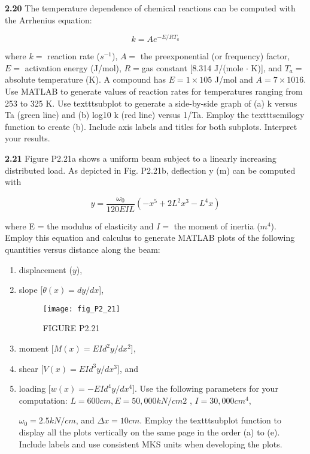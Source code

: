 \documentclass[../main.tex]{subfiles}
\begin{document}
\begin{multicols}{2}
\textbf{2.20} The temperature dependence of chemical reactions can
be computed with the Arrhenius equation:

$$k=Ae^{-E/RT_a}$$

where $k =$ reaction rate ($s^{-1}$), $A =$ the preexponential (or frequency) factor, 
$E =$ activation energy (J/mol), $R = $gas constant [8.314 J/(mole $\cdot$  K)], and $T_a =$ absolute temperature
(K). A compound has $E = 1 \times  105$ J/mol and $A = 7 \times 1016$.
Use MATLAB to generate values of reaction rates for
temperatures ranging from 253 to 325 K. Use texttt{subplot} to
generate a side-by-side graph of (a) k versus Ta (green line)
and (b) log10 k (red line) versus 1/Ta. Employ the texttt{semilogy}
function to create (b). Include axis labels and titles for both
subplots. Interpret your results.


\textbf{2.21} Figure P2.21a shows a uniform beam subject to a linearly increasing distributed load. As depicted in Fig. P2.21b,
deflection y (m) can be computed with

$$y=\dfrac{\omega_0}{120EIL}(-x^5+2L^2x^3-L^4x)$$

where E = the modulus of elasticity and $I =$ the moment of
inertia ($m^4$). Employ this equation and calculus to generate
MATLAB plots of the following quantities versus distance
along the beam:

\begin{enumerate}[label=(\alph*)]
	\item displacement ($y$), 
	\item slope [$\theta(x) = dy/dx$], 


\begin{figure}[H]
	\centering
	\texttt{[image: fig\_P2\_21]}
   \caption*{\textsf{FIGURE P2.21}}
   \label{fig_P2.6}
\end{figure}
\item moment [$M(x) = EId^2 y/dx^2$],
\item shear [$V(x) = EId^3 y/dx^3$], and

\item loading [$w(x) = -EId^4 y/dx^4$].
Use the following parameters for your computation:
$L = 600 cm, E = 50,000 kN/cm2$ , $I = 30,000 cm^4$,

$\omega_0 = 2.5 kN/cm$, and $\Delta x = 10 cm$. Employ the texttt{subplot}
function to display all the plots vertically on the same page
in the order (a) to (e). Include labels and use consistent MKS
units when developing the plots.
\end{enumerate}


\end{multicols}
\end{document}
